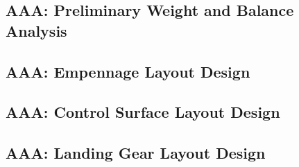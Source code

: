 \documentclass[conf]{new-aiaa}
\begin{document}
\subsection{AAA: Preliminary Weight and Balance Analysis}

\subsection{AAA: Empennage Layout Design}

\subsection{AAA: Control Surface Layout Design}

\subsection{AAA: Landing Gear Layout Design}
\end{document}

